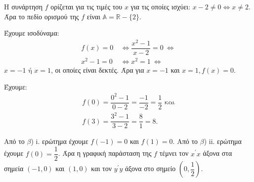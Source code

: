 
\begin{alist}
\item Η συνάρτηση $f$ ορίζεται για τις τιμές του $x$ για τις οποίες ισχύει: $x - 2 \ne 0 \Leftrightarrow x \ne 2$.
Άρα το πεδίο ορισμού της $f$ είναι $\mathbb{A} = \mathbb{R} - \{2\}$.

\item
\begin{rlist}
\item Έχουμε ισοδύναμα:
\begin{align*}
f(x) = 0 \ &\Leftrightarrow 
\dfrac{x^2 - 1}{x - 2} = 0 \ \Leftrightarrow \\
x^2 - 1 = 0 \ &\Leftrightarrow 
x^2 = 1 \ \Leftrightarrow
\end{align*}
$x = -1 \text{ ή } x = 1$, οι οποίες είναι δεκτές.
Άρα για $x = -1$ και $x = 1, f(x) = 0$.

\item Έχουμε:
\begin{gather*}
f(0) = \dfrac{0^2 - 1}{0 - 2} = \dfrac{-1}{-2} = \dfrac{1}{2}\text{ και} \\
f(3) = \dfrac{3^2 - 1}{3 - 2} = \dfrac{8}{1} = 8.
\end{gather*}
\end{rlist}

\item Από το $\beta$) $\text{i.}$ ερώτημα έχουμε $f(-1) = 0$ και $f(1) = 0$. Από το $\beta$) $\text{ii.}$ ερώτημα έχουμε $f(0) = \dfrac{1}{2}$.
Άρα η γραφική παράσταση της $f$ τέμνει τον $x^\prime x$ άξονα στα σημεία $(-1, 0)$ και $(1, 0)$ και τον $y^\prime y$ άξονα στο σημείο $\left(0, \dfrac{1}{2}\right)$.
\end{alist}

